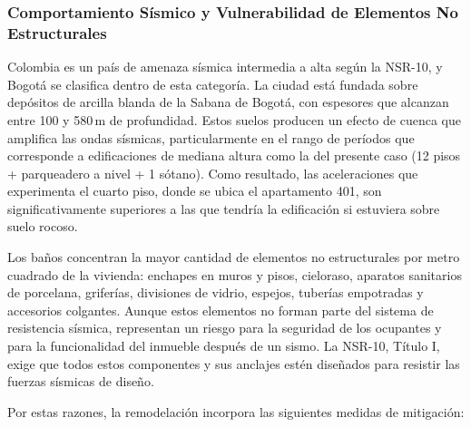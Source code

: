 ﻿\documentclass[12pt]{article}
\begin{document}
\subsubsection{Comportamiento Sísmico y Vulnerabilidad de Elementos No Estructurales}

Colombia es un país de amenaza sísmica intermedia a alta según la NSR-10, y Bogotá se
clasifica dentro de esta categoría. La ciudad está fundada sobre depósitos de arcilla
blanda de la Sabana de Bogotá, con espesores que alcanzan entre 100 y 580\,m de
profundidad. Estos suelos producen un efecto de cuenca que amplifica las ondas sísmicas,
particularmente en el rango de períodos que corresponde a edificaciones de mediana altura
como la del presente caso (12 pisos + parqueadero a nivel + 1 sótano). Como resultado,
las aceleraciones que experimenta el cuarto piso, donde se ubica el apartamento 401,
son significativamente superiores a las que tendría la edificación si estuviera sobre
suelo rocoso.

Los baños concentran la mayor cantidad de elementos no estructurales por metro cuadrado
de la vivienda: enchapes en muros y pisos, cieloraso, aparatos sanitarios de porcelana,
griferías, divisiones de vidrio, espejos, tuberías empotradas y accesorios colgantes.
Aunque estos elementos no forman parte del sistema de resistencia sísmica, representan
un riesgo para la seguridad de los ocupantes y para la funcionalidad del inmueble
después de un sismo. La NSR-10, Título I, exige que todos estos componentes y sus
anclajes estén diseñados para resistir las fuerzas sísmicas de diseño.

Por estas razones, la remodelación incorpora las siguientes medidas de mitigación:
\end{document}
